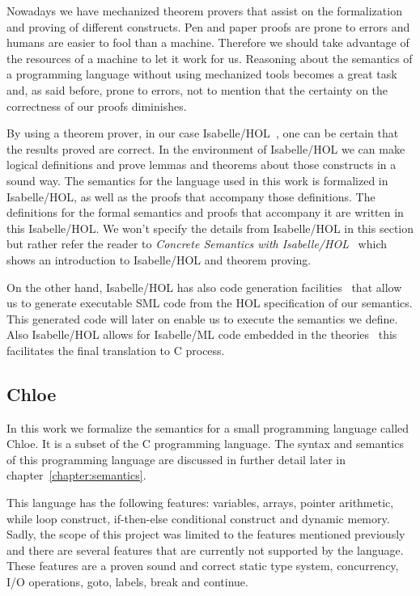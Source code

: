 Nowadays we have mechanized theorem provers that assist on the formalization and proving of different constructs.
Pen and paper proofs are prone to errors and humans are easier to fool than a machine.
Therefore we should take advantage of the resources of a machine to let it work for us.
Reasoning about the semantics of a programming language without using mechanized tools becomes a great task and, as said before, prone to errors, not to mention that the certainty on the correctness of our proofs diminishes.

By using a theorem prover, in our case Isabelle/HOL~\parencite{isabelle-tutorial}, one can be certain that the results proved are correct.
In the environment of Isabelle/HOL we can make logical definitions and prove lemmas and theorems about those constructs in a sound way.
The semantics for the language used in this work is formalized in Isabelle/HOL, as well as the proofs that accompany those definitions.
The definitions for the formal semantics and proofs that accompany it are written in this Isabelle/HOL.
We won't specify the details from Isabelle/HOL in this section but rather refer the reader to \textit{Concrete Semantics with Isabelle/HOL}~\parencite{nipkow} which shows an introduction to Isabelle/HOL and theorem proving.

On the other hand, Isabelle/HOL has also code generation facilities~\parencite{isabelle-codegen} that allow us to generate executable SML code from the HOL specification of our semantics.
This generated code will later on enable us to execute the semantics we define.
Also Isabelle/HOL allows for Isabelle/ML code embedded in the theories~\parencite{isabelle-implementation} this facilitates the final translation to C process.

\subsection{Chloe}\label{subsection:chloe}

In this work we formalize the semantics for a small programming language called Chloe.
It is a subset of the C programming language.
The syntax and semantics of this programming language are discussed in further detail later in chapter~\ref{chapter:semantics}.

This language has the following features: variables, arrays, pointer arithmetic, while loop construct, if-then-else conditional construct and dynamic memory.
Sadly, the scope of this project was limited to the features mentioned previously and there are several features that are currently not supported by the language.
These features are a proven sound and correct static type system, concurrency, I/O operations, goto, labels, break and continue.

